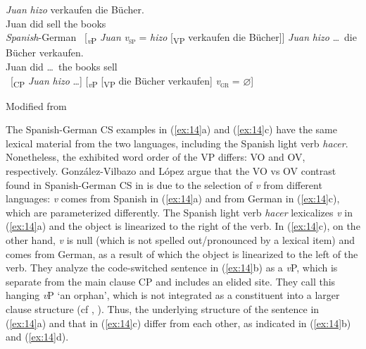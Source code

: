 \begin{exe}\ex \label{ex:14}
    \begin{xlist}
    \ex \gll \textit{Juan} \textit{hizo} verkaufen die Bücher.		\\
     Juan did  sell   the books\\
      \hfill \textit{Spanish}-German
    \ex ~[\textsubscript{\textit{v}P} \textit{Juan} \textit{v}\textsubscript{\textsc{sp}} = \textit{hizo} [\textsubscript{\ac{VP}} verkaufen die Bücher]]
    \ex \gll \textit{Juan} \textit{hizo} \ldots ~die Bücher verkaufen. \\
    Juan did \ldots ~the books   sell\\
    \ex ~[\textsubscript{CP} \textit{Juan} \textit{hizo} \ldots] [\textsubscript{\textit{v}P} [\textsubscript{\ac{VP}} die Bücher verkaufen] \textit{v}\textsubscript{\textsc{gr}} = $\varnothing$] \\
    \end{xlist} 
      \hfill Modified from \citet[52,~(59)]{GonzalezLopez2012}
\end{exe}
	
The Spanish-German \ac{CS} examples in (\ref{ex:14}a) and (\ref{ex:14}c) have the same lexical material from the two languages, including the Spanish light verb \textit{hacer}. Nonetheless, the exhibited word order of the \ac{VP} differs: \ac{VO} and \ac{OV}, respectively. González-Vilbazo and López argue that the \ac{VO} vs \ac{OV} contrast found in Spanish-German \ac{CS} in  is due to the selection of \textit{v} from different languages: \textit{v} comes from Spanish in (\ref{ex:14}a) and from German in (\ref{ex:14}c), which are parameterized differently. The Spanish light verb \textit{hacer} lexicalizes \textit{v} in (\ref{ex:14}a) and the object is linearized to the right of the verb. In (\ref{ex:14}c), on the other hand, \textit{v} is null (which is not spelled out/pronounced by a lexical item) and comes from German, as a result of which the object is linearized to the left of the verb. They analyze the code-switched sentence in (\ref{ex:14}b) as a \textit{v}P, which is separate from the main clause \ac{CP} and includes an elided site. They call this hanging \textit{v}P ‘an orphan’, which is not integrated as a constituent into a larger clause structure (cf \citealt{Haegeman1991}, \citealt{Shaer2003}). Thus, the underlying structure of the sentence in (\ref{ex:14}a) and that in (\ref{ex:14}c) differ from each other, as indicated in (\ref{ex:14}b) and (\ref{ex:14}d). 

